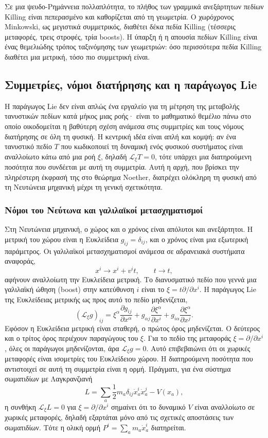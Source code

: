 \documentclass[12pt]{article}
\begin{document}
Σε μια ψευδο-Ρημάννεια πολλαπλότητα, το πλήθος των γραμμικά ανεξάρτητων πεδίων Killing είναι πεπερασμένο και καθορίζεται από τη γεωμετρία. Ο χωρόχρονος Minkowski, ως μεγιστικά συμμετρικός, διαθέτει δέκα πεδία Killing (τέσσερις μεταφορές, τρεις στροφές, τρία boosts). Η ύπαρξη ή η απουσία πεδίων Killing είναι ένας θεμελιώδης τρόπος ταξινόμησης των γεωμετριών: όσο περισσότερα πεδία Killing διαθέτει μια μετρική, τόσο πιο συμμετρική είναι.

\subsection{Συμμετρίες, νόμοι διατήρησης και η παράγωγος Lie}

Η παράγωγος Lie δεν είναι απλώς ένα εργαλείο για τη μέτρηση της μεταβολής τανυστικών πεδίων κατά μήκος μιας ροής· είναι το μαθηματικό θεμέλιο πάνω στο οποίο οικοδομείται η βαθύτερη σχέση ανάμεσα στις συμμετρίες και τους νόμους διατήρησης σε όλη τη φυσική. Η κεντρική ιδέα είναι απλή και κομψή: αν ένα τανυστικό πεδίο $T$ που κωδικοποιεί τη δυναμική ενός φυσικού συστήματος είναι αναλλοίωτο κάτω από μια ροή $\xi$, δηλαδή $\mathcal{L}_\xi T = 0$, τότε υπάρχει μια διατηρούμενη ποσότητα που συνδέεται με αυτή τη συμμετρία. Αυτή η αρχή, που βρίσκει την πληρέστερη έκφρασή της στο θεώρημα Noether, διατρέχει ολόκληρη τη φυσική από τη Νευτώνεια μηχανική μέχρι τη γενική σχετικότητα.

\subsubsection{Νόμοι του Νεύτωνα και γαλιλαϊκοί μετασχηματισμοί}

Στη Νευτώνεια μηχανική, ο χώρος και ο χρόνος είναι απόλυτοι και ανεξάρτητοι. Η μετρική του χώρου είναι η Ευκλείδεια $g_{ij} = \delta_{ij}$, και ο χρόνος είναι μια εξωτερική παράμετρος. Οι γαλιλαϊκοί μετασχηματισμοί ανάμεσα σε αδρανειακά συστήματα αναφοράς,
\[
x^i \to x^i + v^i t, \qquad t \to t,
\]
αφήνουν αναλλοίωτη την Ευκλείδεια μετρική. Το διανυσματικό πεδίο που γεννά μια γαλιλαϊκή ώθηση (boost) στην κατεύθυνση $i$ είναι το $\xi = t \partial / \partial x^i$. Η παράγωγος Lie της Ευκλείδειας μετρικής ως προς αυτό το πεδίο μηδενίζεται,
\[
(\mathcal{L}_\xi g)_{ij} = \xi^\alpha \frac{\partial g_{ij}}{\partial x^\alpha} + g_{\alpha j} \frac{\partial \xi^\alpha}{\partial x^i} + g_{i\alpha} \frac{\partial \xi^\alpha}{\partial x^j}.
\]
Εφόσον η Ευκλείδεια μετρική είναι σταθερή, ο πρώτος όρος μηδενίζεται. Ο δεύτερος και ο τρίτος όρος περιέχουν παραγώγους του $\xi$. Για το πεδίο της μεταφοράς $\xi = \partial / \partial x^i$, όλες οι παράγωγοι μηδενίζονται, άρα $\mathcal{L}_\xi g = 0$. Αυτό επιβεβαιώνει ότι οι χωρικές μεταφορές είναι ισομετρίες του Ευκλείδειου χώρου. Η διατηρούμενη ποσότητα που αντιστοιχεί σε αυτή τη συμμετρία είναι η ορμή. Πράγματι, για ένα σύστημα σωματιδίων με Λαγκρανζιανή
\[
L = \sum_a \frac{1}{2} m_a \delta_{ij} \dot{x}^i_a \dot{x}^j_a - V(x_a),
\]
η συνθήκη $\mathcal{L}_\xi L = 0$ για $\xi = \partial / \partial x^i$ σημαίνει ότι το δυναμικό $V$ είναι αναλλοίωτο σε χωρικές μεταφορές, δηλαδή εξαρτάται μόνο από τις σχετικές αποστάσεις των σωματιδίων. Τότε η ολική ορμή $P^i = \sum_a m_a \dot{x}^i_a$ διατηρείται.
\end{document}
